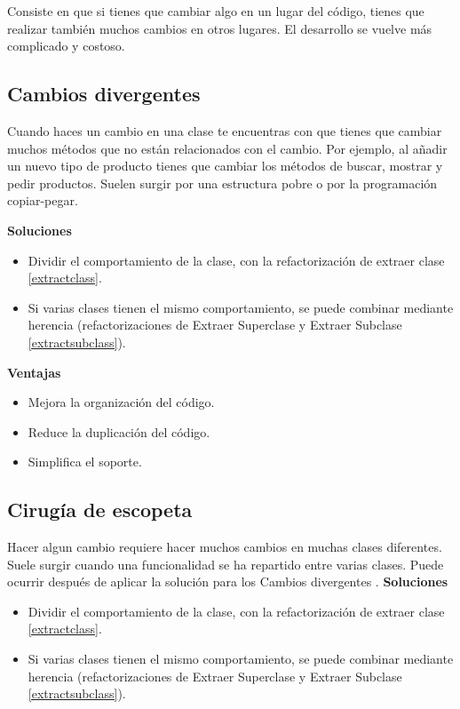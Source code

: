 \documentclass[11pt,a4paper,oneside]{book}
\begin{document}
Consiste en que si tienes que cambiar algo en un lugar del código, tienes que realizar también muchos cambios en otros lugares. El desarrollo se vuelve más complicado y costoso.

\subsection{Cambios divergentes}
\label{cambiosdivergentes}
Cuando haces un cambio en una clase te encuentras con que tienes que cambiar muchos métodos que no están relacionados con el cambio. Por ejemplo, al añadir un nuevo tipo de producto tienes que cambiar los métodos de buscar, mostrar y pedir productos.
\newline
Suelen surgir por una estructura pobre o por la programación copiar-pegar.

\textbf{Soluciones}
\begin{itemize}
    \item Dividir el comportamiento de la clase, con la refactorización de extraer clase \ref{extractclass}.
    \item Si varias clases tienen el mismo comportamiento, se puede combinar mediante herencia (refactorizaciones de Extraer Superclase  y Extraer Subclase \ref{extractsubclass}).
\end{itemize}

\newline

\textbf{Ventajas}
\begin{itemize}
    \item Mejora la organización del código.
    \item Reduce la duplicación del código.
    \item Simplifica el soporte.
\end{itemize}

\subsection{Cirugía de escopeta}
Hacer algun cambio requiere hacer muchos cambios en muchas clases diferentes.
\newline
Suele surgir cuando una funcionalidad se ha repartido entre varias clases. Puede ocurrir después de aplicar la solución para los Cambios divergentes .
\textbf{Soluciones}
\begin{itemize}
    \item Dividir el comportamiento de la clase, con la refactorización de extraer clase \ref{extractclass}.
    \item Si varias clases tienen el mismo comportamiento, se puede combinar mediante herencia (refactorizaciones de Extraer Superclase  y Extraer Subclase \ref{extractsubclass}).
\end{itemize}
\end{document}
